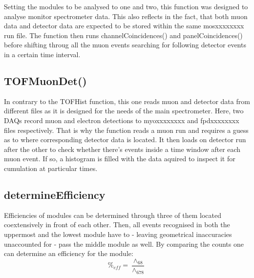     Setting the modules to be analysed to one and two, this function was designed to analyse monitor spectrometer data. This also reflects in the fact, that both muon data and detector data are expected to be stored within the same mosxxxxxxxx run file. The function then runs channelCoincidences() and panelCoincidences() before shifting throug all the muon events searching for following detector events in a certain time interval.
    
    \subsection{TOFMuonDet()}
    \label{ch:Analysis software:sec:methods of the class run:subsec:TOFMuonDet()}
    
    In contrary to the TOFHist function, this one reads muon and detector data from different files as it is designed for the needs of the main spectrometer. Here, two DAQs record muon and electron detections to myoxxxxxxxx and fpdxxxxxxxx files respectively. That is why the function reads a muon run and requires a guess as to where corresponding detector data is located. It then loads on detector run after the other to check whether there's events inside a time window after each muon event. If so, a histogram is filled with the data aquired to inspect it for cumulation at particular times. 
    
    \subsection{determineEfficiency}
    \label{ch:Analysis software:sec:methods of the class run:subsec:determineEfficiency}
    
    Efficiencies of modules can be determined through three of them located coextensively in front of each other. Then, all events recognised in both the uppermost and the lowest module have to - leaving geometrical inaccuracies unaccounted for - pass the middle module as well. By comparing the counts one can determine an efficiency for the module:
    \begin{equation}
    	\%_{eff} = \frac{\wedge_{68}}{{\wedge_{678}}}
    \end{equation}
    
    
    
